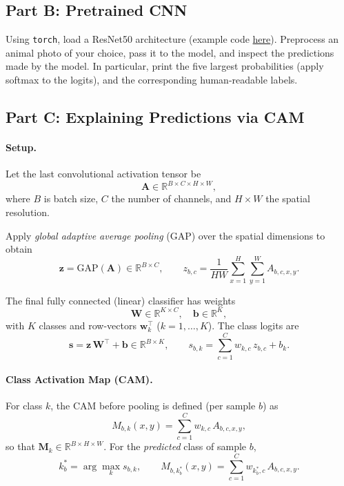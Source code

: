 \documentclass{article}
\begin{document}
\subsection*{Part B: Pretrained CNN}
Using \texttt{torch}, load a ResNet50 architecture (example code \href{https://pytorch.org/hub/nvidia_deeplearningexamples_resnet50/}{here}).
Preprocess an animal photo of your choice, pass it to the model, and inspect the predictions made by the model.
In particular, print the five largest probabilities (apply softmax to the logits), and the corresponding human-readable labels.

\subsection*{Part C: Explaining Predictions via CAM}

\paragraph{Setup.}
Let the last convolutional activation tensor be
\[
\mathbf{A}\in\mathbb{R}^{B\times C\times H\times W},
\]
where $B$ is batch size, $C$ the number of channels, and $H\times W$ the spatial resolution.

Apply \emph{global adaptive average pooling} (GAP) over the spatial dimensions to obtain
\[
\mathbf{z}=\mathrm{GAP}(\mathbf{A})\in\mathbb{R}^{B\times C},\qquad
z_{b,c}=\frac{1}{HW}\sum_{x=1}^{H}\sum_{y=1}^{W} A_{b,c,x,y}.
\]

The final fully connected (linear) classifier has weights
\[
\mathbf{W}\in\mathbb{R}^{K\times C},\quad \mathbf{b}\in\mathbb{R}^{K},
\]
with $K$ classes and row-vectors $\mathbf{w}_k^\top$ ($k=1,\dots,K$). The class logits are
\[
\mathbf{s}=\mathbf{z}\,\mathbf{W}^\top+\mathbf{b}\in\mathbb{R}^{B\times K},\qquad
s_{b,k}=\sum_{c=1}^{C} w_{k,c}\, z_{b,c}+b_k.
\]

\paragraph{Class Activation Map (CAM).}
For class $k$, the CAM before pooling is defined (per sample $b$) as
\[
M_{b,k}(x,y)=\sum_{c=1}^{C} w_{k,c}\, A_{b,c,x,y},
\]
so that $\mathbf{M}_k\in\mathbb{R}^{B\times H\times W}$. For the \emph{predicted} class of sample $b$,
\[
k_b^\ast=\arg\max_{k} s_{b,k},\qquad
M_{b,k_b^\ast}(x,y)=\sum_{c=1}^{C} w_{k_b^\ast,c}\, A_{b,c,x,y}.
\]
\end{document}
